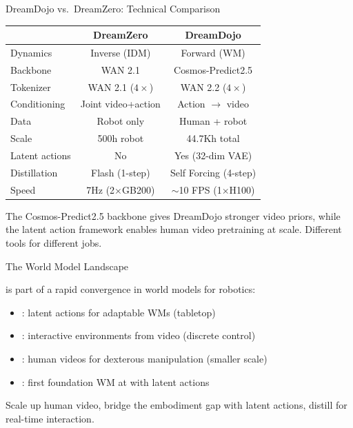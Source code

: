 \begin{frame}{DreamDojo vs.\ DreamZero: Technical Comparison}
\begin{center}
{\small
\begin{tabular}{lcc}
\toprule
& \textbf{DreamZero} & \textbf{DreamDojo}\\
\midrule
Dynamics & Inverse (IDM) & Forward (WM)\\
Backbone & WAN 2.1 & Cosmos-Predict2.5\\
Tokenizer & WAN 2.1 ($4\times$) & WAN 2.2 ($4\times$)\\
Conditioning & Joint video+action & Action $\rightarrow$ video\\
Data & Robot only & Human + robot\\
Scale & 500h robot & 44.7Kh total\\
Latent actions & No & Yes (32-dim VAE)\\
Distillation & Flash (1-step) & Self Forcing (4-step)\\
Speed & 7Hz (2$\times$GB200) & $\sim$10 FPS (1$\times$H100)\\
\bottomrule
\end{tabular}
}
\end{center}

\vspace{0.3em}
\begin{softbox}
 The Cosmos-Predict2.5 backbone gives
DreamDojo stronger video priors, while the latent action
framework enables human video pretraining at scale.
Different tools for different jobs.
\end{softbox}
\end{frame}

\begin{frame}{The World Model Landscape}
\begin{softbox}
 is part of a rapid convergence in
world models for robotics:
\end{softbox}

\vspace{0.3em}
\begin{itemize}
    \item {} \citep{gao2025adaworld}:
          latent actions for adaptable WMs (tabletop)
    \item {} \citep{bruce2024genie}:
          interactive environments from video
          (discrete control)
    \item {} \citep{goswami2025dexwm}:
          human videos for dexterous manipulation
          (smaller scale)
    \item {}: first foundation WM at
           with
           latent actions
\end{itemize}

\vspace{0.3em}
 Scale up human video,
bridge the embodiment gap with latent actions,
distill for real-time interaction.
\end{frame}

